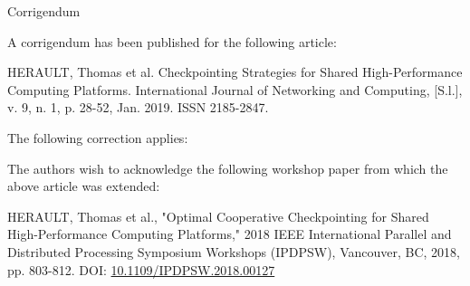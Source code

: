 \documentclass[twoside]{article}
\newcommand{\jtitle}{Corrigendum}
\begin{document}
\thispagestyle{empty}
\copyrightheader

\begin{center}
\jtitle

\vspace{20pt}

\end{center}


A corrigendum has been published for the following article:
 
HERAULT, Thomas et al. Checkpointing Strategies for Shared High-Performance Computing Platforms. International Journal of Networking and Computing, [S.l.], v. 9, n. 1, p. 28-52, Jan. 2019. ISSN 2185-2847.
 
The following correction applies:
 
The authors wish to acknowledge the following workshop paper from which the above article was extended:
 
HERAULT, Thomas et al., "Optimal Cooperative Checkpointing for Shared High-Performance Computing Platforms," 2018 IEEE International Parallel and Distributed Processing Symposium Workshops (IPDPSW), Vancouver, BC, 2018, pp. 803-812. DOI: \url{10.1109/IPDPSW.2018.00127}
 
\end{document}
